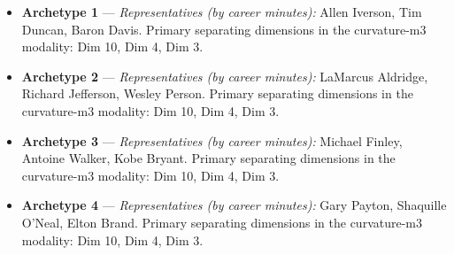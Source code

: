\begin{itemize}
\item \textbf{Archetype 1} --- \emph{Representatives (by career minutes):} Allen Iverson, Tim Duncan, Baron Davis. Primary separating dimensions in the curvature-m3 modality: Dim 10, Dim 4, Dim 3.
\item \textbf{Archetype 2} --- \emph{Representatives (by career minutes):} LaMarcus Aldridge, Richard Jefferson, Wesley Person. Primary separating dimensions in the curvature-m3 modality: Dim 10, Dim 4, Dim 3.
\item \textbf{Archetype 3} --- \emph{Representatives (by career minutes):} Michael Finley, Antoine Walker, Kobe Bryant. Primary separating dimensions in the curvature-m3 modality: Dim 10, Dim 4, Dim 3.
\item \textbf{Archetype 4} --- \emph{Representatives (by career minutes):} Gary Payton, Shaquille O'Neal, Elton Brand. Primary separating dimensions in the curvature-m3 modality: Dim 10, Dim 4, Dim 3.
\end{itemize}
